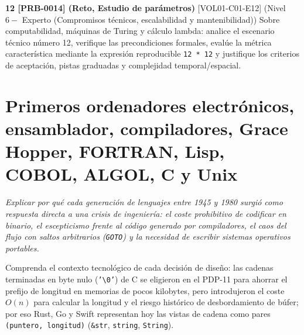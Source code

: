 \documentclass{book}
\begin{document}
\begin{tcolorbox}[title={Ejercicios}, studiumworked, breakable]
\noindent\textbf{12 [PRB-0014] (Reto, Estudio de parámetros)}
[VOL01-C01-E12] (Nivel \(6 -\) Experto (Compromisos técnicos, escalabilidad y mantenibilidad)) Sobre computabilidad, máquinas de Turing y cálculo lambda: analice el escenario técnico número 12, verifique las precondiciones formales, evalúe la métrica característica mediante la expresión reproducible \texttt{12 * 12} y justifique los criterios de aceptación, pistas graduadas y complejidad temporal/espacial.
\end{tcolorbox}

\chapter{Primeros ordenadores electrónicos, ensamblador, compiladores, Grace Hopper, FORTRAN, Lisp, COBOL, ALGOL, C y Unix}
\label{chap:cap02-primeros-ordenadores-y-compiladores}

\noindent\textit{Explicar por qué cada generación de lenguajes entre 1945 y 1980 surgió como respuesta directa a una crisis de ingeniería: el coste prohibitivo de codificar en binario, el escepticismo frente al código generado por compiladores, el caos del flujo con saltos arbitrarios (\texttt{GOTO}) y la necesidad de escribir sistemas operativos portables.}

\begin{tcolorbox}[title={Consejo}, studiumtip, breakable]

Comprenda el contexto tecnológico de cada decisión de diseño: las cadenas terminadas en byte nulo (\texttt{'\textbackslash{}0'}) de C se eligieron en el PDP-11 para ahorrar el prefijo de longitud en memorias de pocos kilobytes, pero introdujeron el coste \(O(n)\) para calcular la longitud y el riesgo histórico de desbordamiento de búfer; por eso Rust, Go y Swift representan hoy las vistas de cadena como pares \texttt{(puntero, longitud)} (\texttt{\&str}, \texttt{string}, \texttt{String}).
\end{tcolorbox}
\end{document}
